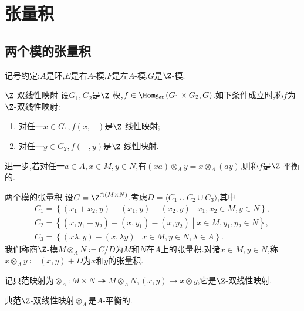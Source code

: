 \chapter{张量积}

\section{两个模的张量积}


记号约定:$A$是环,$E$是右$A$-模,$F$是左$A$-模,$G$是$\Z$-模.

\begin{definition}{$\Z$-双线性映射}{}
	设$G_{1},G_{2}$是$\Z$-模,$f\in\Hom_{\mathsf{Set}}\left(G_{1}\times G_{2},G\right)$.如下条件成立时,称$f$为$\Z$-双线性映射:
	\begin{enumerate}
		\item 对任一$x\in G_{1},f\left(x,-\right)$是$\Z$-线性映射;
		\item 对任一$y\in G_{2},f\left(-,y\right)$是$\Z$-线性映射.
	\end{enumerate}
	进一步,若对任一$a\in A,x\in M,y\in N$,有$\left(xa\right)\otimes_{A}y=x\otimes_{A}\left(ay\right)$,则称$f$是$\Z$-平衡的.
\end{definition}

\begin{definition}{两个模的张量积}{}
	设$C=\Z^{\oplus\left(M\times N\right)}$.考虑$D=\langle C_{1}\cup C_{2}\cup C_{3}\rangle$,其中
	\begin{gather*}
		C_{1}=\left\{\left(x_{1}+x_{2},y\right)-\left(x_{1},y\right)-\left(x_{2},y\right)\middle|x_{1},x_{2}\in M,y\in N\right\},\\
		C_{2}=\left\{\left(x,y_{1}+y_{2}\right)-\left(x,y_{1}\right)-\left(x,y_{2}\right)\middle|x\in M,y_{1},y_{2}\in N\right\},\\
		C_{3}=\left\{\left(x\lambda,y\right)-\left(x,\lambda y\right)\middle|x\in M,y\in N,\lambda\in A\right\}.
	\end{gather*}
	我们称商$\Z$-模$M\otimes_{A}N\coloneq C/D$为$M$和$N$在$A$上的张量积.对诸$x\in M,y\in N$,称$x\otimes_{A}y\coloneq\left(x,y\right)+D$为$x$和$y$的张量积.
	
	记典范映射为$\otimes_{A}:M\times N\twoheadrightarrow M\otimes_{A}N,\left(x,y\right)\mapsto x\otimes y$,它是$\Z$-双线性映射.
\end{definition}

\begin{remark}{}{}
	典范$\Z$-双线性映射$\otimes_{A}$是$A$-平衡的.
\end{remark}

